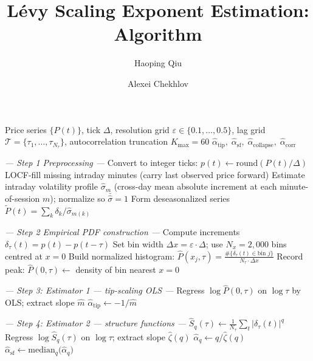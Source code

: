 \documentclass[12pt,a4paper]{article}
\title{Lévy Scaling Exponent Estimation: Algorithm}
\author{Haoping Qiu \and Alexei Chekhlov}
\date{}
\newcommand{\alphah}{\hat{\alpha}}
\newcommand{\Ph}{\hat{P}}
\begin{document}
\maketitle

\begin{algorithm}[H]
\caption{Lévy Scaling Exponent Estimation}
\label{alg:pipeline}
\begin{algorithmic}[1]

\Require Price series $\{P(t)\}$, tick $\Delta$, resolution grid
         $\varepsilon\in\{0.1,\ldots,0.5\}$, lag grid
         $\mathcal{T}=\{\tau_1,\ldots,\tau_{N_\tau}\}$,
         autocorrelation truncation $K_{\max}=60$
\Ensure $\alphah_{\mathrm{tip}},\;\alphah_{\mathrm{sf}},\;
         \alphah_{\mathrm{collapse}},\;\alphah_{\mathrm{corr}}$

\Statex
\Statex \textit{--- Step 1 Preprocessing ---}
\State Convert to integer ticks: $p(t) \leftarrow \mathrm{round}(P(t)/\Delta)$
\State LOCF-fill missing intraday minutes (carry last observed price forward)
\State Estimate intraday volatility profile $\hat\sigma_m$
       (cross-day mean absolute increment at each minute-of-session $m$);
       normalize so $\bar{\hat\sigma}=1$
\State Form deseasonalized series $\tilde{P}(t)=\sum_k \delta_k/\hat\sigma_{m(k)}$

\Statex
\Statex \textit{--- Step 2 Empirical PDF construction ---}
  \State Compute increments $\delta_\tau(t) = p(t) - p(t-\tau)$
  \State Set bin width $\Delta x = \varepsilon\cdot\Delta$;
         use $N_x = 2{,}000$ bins centred at $x=0$
  \State Build normalized histogram:
         $\Ph(x_j,\tau) = \frac{\#\{\delta_\tau(t)\in\text{bin }j\}}{N_\tau \cdot \Delta x}$
  \State Record peak: $\Ph(0,\tau) \leftarrow$ density of bin nearest $x=0$
\EndFor

\Statex
\Statex \textit{--- Step 3: Estimator 1 — tip-scaling OLS ---}
\State Regress $\log\Ph(0,\tau)$ on $\log\tau$ by OLS; extract slope $\hat{m}$
\State $\alphah_{\mathrm{tip}} \leftarrow -1/\hat{m}$
       \hfill{}

\Statex
\Statex \textit{--- Step 4: Estimator 2 — structure functions ---}
  \State $\hat{S}_q(\tau) \leftarrow \frac{1}{N_\tau}\sum_t|\delta_\tau(t)|^q$
  \State Regress $\log\hat{S}_q(\tau)$ on $\log\tau$;
         extract slope $\hat\zeta(q)$
  \State $\alphah_q \leftarrow q/\hat\zeta(q)$
         \hfill{}
\EndFor
\State $\alphah_{\mathrm{sf}} \leftarrow \mathrm{median}_q\bigl(\alphah_q\bigr)$


\end{algorithmic}
\end{algorithm}
\end{document}
